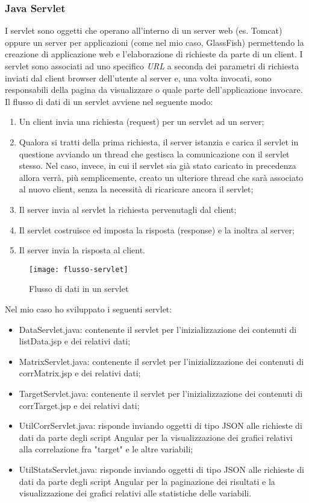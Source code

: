 \subsubsection{Java Servlet}
I servlet sono oggetti che operano all'interno di un server web (es. Tomcat) oppure un server per applicazioni (come nel mio caso, GlassFish) permettendo la creazione di applicazione web e l'elaborazione di richieste da parte di un client.
I servlet sono associati ad uno specifico \textit{URL} a seconda dei parametri di richiesta inviati dal client browser dell'utente al server e, una volta invocati, sono responsabili della pagina da visualizzare o quale parte dell'applicazione invocare.\\
Il flusso di dati di un servlet avviene nel seguente modo:
\begin{enumerate}
	\item Un client invia una richiesta (request) per un servlet ad un server;
	\item Qualora si tratti della prima richiesta, il server istanzia e carica il servlet in questione avviando un thread che gestisca la comunicazione con il servlet stesso. Nel caso, invece, in cui il servlet sia già stato caricato in precedenza allora verrà, più semplicemente, creato un ulteriore thread che sarà associato al nuovo client, senza la necessità di ricaricare ancora il servlet;
	\item Il server invia al servlet la richiesta pervenutagli dal client;
	\item Il servlet costruisce ed imposta la risposta (response) e la inoltra al server;
	\item Il server invia la risposta al client.
\end{enumerate}
\begin{figure}[!h]
	\centering
	\texttt{[image: flusso-servlet]}
	\caption{Flusso di dati in un servlet}
\end{figure}

Nel mio caso ho sviluppato i seguenti servlet:
\begin{itemize}
	\item DataServlet.java: contenente il servlet per l'inizializzazione  dei contenuti di listData.jsp e dei relativi dati;
	\item MatrixServlet.java: contenente il servlet per l'inizializzazione  dei contenuti di corrMatrix.jsp e dei relativi dati;
	\item TargetServlet.java: contenente il servlet per l'inizializzazione  dei contenuti di corrTarget.jsp e dei relativi dati;
	\item UtilCorrServlet.java: risponde inviando oggetti di tipo \gls{JSON} alle richieste di dati da parte degli script Angular per la visualizzazione dei grafici relativi alla correlazione fra "target" e le altre variabili;
	\item UtilStatsServlet.java: risponde inviando oggetti di tipo \gls{JSON} alle richieste di dati da parte degli script Angular per la paginazione dei risultati e la visualizzazione dei grafici relativi alle statistiche delle variabili.
\end{itemize}

